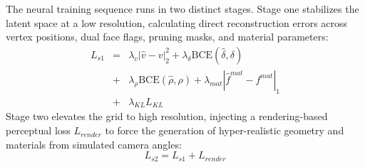 The neural training sequence runs in two distinct stages. Stage one stabilizes the latent space at a low resolution, calculating direct reconstruction errors across vertex positions, dual face flags, pruning masks, and material parameters:
\begin{equation}
\begin{array}{rcl}
L_{s1} & = & \lambda_v|\hat{v} -v|_2^2 + \lambda_\delta \mathrm{BCE}(\hat{\delta},\delta) \\
       & + & \lambda_\rho \mathrm{BCE}(\hat{\rho},\rho) + \lambda_{mat}|\hat{f}^{mat} - f^{mat}|_1 \\
       & + & \lambda_{KL}L_{KL}
\end{array}
\end{equation}
Stage two elevates the grid to high resolution, injecting a rendering-based perceptual loss $L_{render}$ to force the generation of hyper-realistic geometry and materials from simulated camera angles:
\begin{equation}
L_{s2} = L_{s1} + L_{render}
\end{equation}